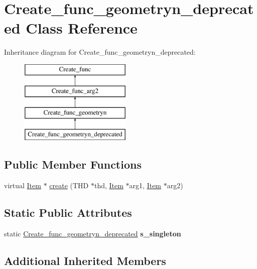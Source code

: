 \hypertarget{classCreate__func__geometryn__deprecated}{}\section{Create\+\_\+func\+\_\+geometryn\+\_\+deprecated Class Reference}
\label{classCreate__func__geometryn__deprecated}
Inheritance diagram for Create\+\_\+func\+\_\+geometryn\+\_\+deprecated\+:\begin{figure}[H]
\begin{center}
\leavevmode
\includegraphics[height=4.000000cm]{classCreate__func__geometryn__deprecated}
\end{center}
\end{figure}
\subsection*{Public Member Functions}
\begin{DoxyCompactItemize}
\item 
virtual \mbox{\hyperlink{classItem}{Item}} $\ast$ \mbox{\hyperlink{classCreate__func__geometryn__deprecated_a2ac069d34de0c519293d9c03dbdb675d}{create}} (T\+HD $\ast$thd, \mbox{\hyperlink{classItem}{Item}} $\ast$arg1, \mbox{\hyperlink{classItem}{Item}} $\ast$arg2)
\end{DoxyCompactItemize}
\subsection*{Static Public Attributes}
\begin{DoxyCompactItemize}
\item 
\mbox{\label{classCreate__func__geometryn__deprecated_aae949094c9cd145900350e7af2d18f43}} 
static \mbox{\hyperlink{classCreate__func__geometryn__deprecated}{Create\+\_\+func\+\_\+geometryn\+\_\+deprecated}} {\bfseries s\+\_\+singleton}
\end{DoxyCompactItemize}
\subsection*{Additional Inherited Members}


